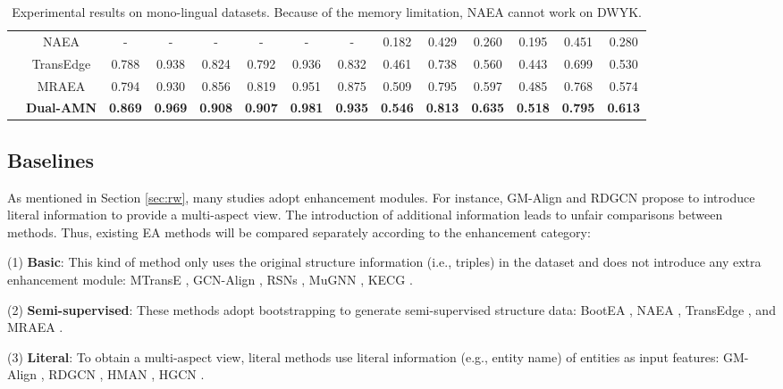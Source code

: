 \documentclass[sigconf]{acmart}
\begin{document}
\begin{table*}[!t]
\begin{center}
{\begin{tabular}{c|ccccccccccccc}
  & NAEA & - & - & - & - & - & - & 0.182 & 0.429 & 0.260  &0.195&0.451& 0.280\\
  & TransEdge&0.788&0.938&0.824&0.792&0.936&0.832&0.461&0.738&0.560&0.443&0.699&0.530\\
  & MRAEA &0.794&0.930&0.856&0.819&0.951&0.875&0.509&0.795&0.597&0.485&0.768&0.574\\
  & \textbf{Dual-AMN} &\textbf{0.869}&\textbf{0.969}&\textbf{0.908}&\textbf{0.907}&\textbf{0.981}&\textbf{0.935}&\textbf{0.546}&\textbf{0.813}&\textbf{0.635}&\textbf{0.518}&\textbf{0.795}&\textbf{0.613}\\
    \bottomrule
\end{tabular}
}
\caption{Experimental results on mono-lingual datasets.
Because of the memory limitation, NAEA cannot work on DWYK.
}
\label{table:res2}
\end{center}
\end{table*}

\subsection{Baselines}
As mentioned in Section \ref{sec:rw}, many studies adopt enhancement modules.
For instance, GM-Align and RDGCN propose to introduce literal information to provide a multi-aspect view.
The introduction of additional information leads to unfair comparisons between methods.
Thus, existing EA methods will be compared separately according to the enhancement category:

(1) \textbf{Basic}:
This kind of method only uses the original structure information (i.e., triples) in the dataset and does not introduce any extra enhancement module:
MTransE \cite{DBLP:conf/ijcai/ChenTYZ17}, GCN-Align \cite{DBLP:conf/emnlp/WangLLZ18}, RSNs \cite{DBLP:conf/icml/GuoSH19}, MuGNN \cite{DBLP:conf/acl/CaoLLLLC19}, KECG \cite{DBLP:conf/emnlp/LiCHSLC19}.

(2) \textbf{Semi-supervised}:
These methods adopt bootstrapping to generate semi-supervised structure data:
BootEA \cite{DBLP:conf/ijcai/SunHZQ18}, NAEA \cite{DBLP:conf/ijcai/ZhuZ0TG19}, TransEdge \cite{DBLP:journals/corr/abs-2004-13579}, and MRAEA \cite{DBLP:conf/wsdm/MaoWXLW20}.

(3) \textbf{Literal}:
To obtain a multi-aspect view, literal methods use literal information (e.g., entity name) of entities as input features:
GM-Align \cite{DBLP:conf/acl/XuWYFSWY19}, RDGCN \cite{DBLP:conf/ijcai/WuLF0Y019}, HMAN \cite{DBLP:conf/emnlp/YangZSLLS19}, HGCN \cite{DBLP:conf/emnlp/WuLFWZ19}.
\end{document}
